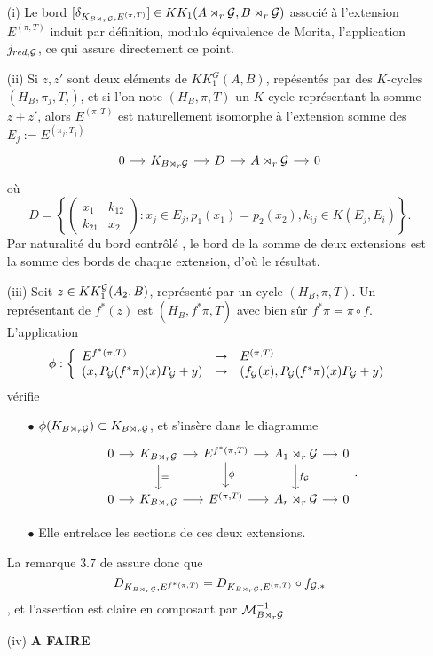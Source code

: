 \begin{dem}
\begin{enumerate}

\item[(i)] Le bord $[\delta_{K_{B\rtimes_r \mathcal G},E^{(\pi,T)}}]\in KK_1(A\rtimes_r \mathcal G, B\rtimes_r \mathcal G)$ associé à l'extension $E^{(\pi,T)}$ induit par définition, modulo équivalence de Morita, l'application $j_{red,\mathcal G}$, ce qui assure directement ce point.

\item[(ii)] Si $z,z'$ sont deux eléments de $KK_1^G(A,B)$, repésentés par des $K$-cycles $(H_B,\pi_j,T_j)$, et si l'on note $(H_B,\pi,T)$ un $K$-cycle représentant la somme $z+z'$, alors $E^{(\pi,T)}$ est naturellement isomorphe à l'extension somme des $E_j:=E^{(\pi_j,T_j)}$
\[\begin{tikzcd}[column sep = small]
0\arrow{r} & K_{B\rtimes_r \G} \arrow{r} & D \arrow{r} & A\rtimes_r \G \arrow{r} & 0
\end{tikzcd}\]
où 
\[D=\left\{\begin{pmatrix}x_1 & k_{12}\\ k_{21} & x_2\end{pmatrix} : x_j\in E_j , p_1(x_1)=p_2(x_2), k_{ij}\in K(E_j,E_i)\right\}.\]
Par naturalité du bord contrôlé \cite{OY2}, le bord de la somme de deux extensions est la somme des bords de chaque extension, d'où le résultat.
\item[(iii)] Soit $z\in KK_1^\mathcal G(A_2,B)$, représenté par un cycle $(H_B,\pi,T)$. Un représentant de $f^*(z)$ est $(H_B,f^*\pi,T)$ avec bien sûr $f^*\pi=\pi \circ f$. L'application 
\[\phi : \left\{\begin{array}{lll} E^{f^*(\pi,T)} & \rightarrow & E^{(\pi,T)} \\
( x, P_\mathcal G(f^*\pi)(x)P_\mathcal G+y) & \rightarrow & ( f_\mathcal G(x), P_\mathcal G(f^*\pi)(x)P_\mathcal G+y) \end{array}\right. \]
vérifie
\begin{enumerate}
\item[$\bullet$] $\phi(K_{B\rtimes_r \mathcal G})\subset K_{B\rtimes_r \mathcal G}$, et s'insère dans le diagramme
\[\begin{tikzcd}[column sep = small]
0\arrow{r} & K_{B\rtimes_r \G}\arrow{r}\arrow{d}{=} & E^{f^*(\pi,T)} \arrow{r}\arrow{d}{\phi}& A_1\rtimes_r \G\arrow{r}\arrow{d}{f_\G} & 0\\
0\arrow{r} & K_{B\rtimes_r \G}\arrow{r} & E^{(\pi,T)} \arrow{r}& A_r\rtimes_r \G\arrow{r} & 0
\end{tikzcd}.\]
\item[$\bullet$] Elle entrelace les sections de ces deux extensions.
\end{enumerate}
La remarque $3.7$ de \cite{OY2} assure donc que \[D_{K_{B\rtimes_r \mathcal G}, E^{f^*(\pi,T)} } =  D_{K_{B\rtimes_r \mathcal G}, E^{(\pi,T)} }\circ f_{\mathcal G,*}\], et l'assertion est claire en composant par $\mathcal M_{B\rtimes_r \mathcal G}^{-1}$.

\item[(iv)] \textbf{A FAIRE}
\end{enumerate}
\end{dem}

